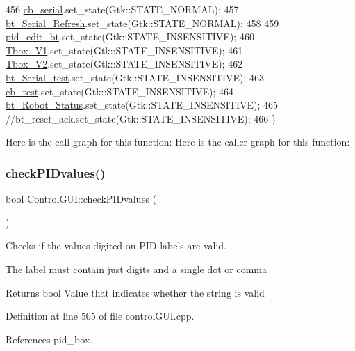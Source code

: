 \begin{DoxyCode}
456     \hyperlink{class_control_g_u_i_a730f792c7de4d8c3cd4c933876d8bc52}{cb\_serial}.set\_state(Gtk::STATE\_NORMAL);
457     \hyperlink{class_control_g_u_i_a391e47311e2e097bf551726b1df5d794}{bt\_Serial\_Refresh}.set\_state(Gtk::STATE\_NORMAL);
458 
459     \hyperlink{class_control_g_u_i_a25b5eb5bf471a963e86624d3fa2c39a7}{pid\_edit\_bt}.set\_state(Gtk::STATE\_INSENSITIVE);
460     \hyperlink{class_control_g_u_i_a8c9b9a41a7ac7de9a7c1c323f70e43b4}{Tbox\_V1}.set\_state(Gtk::STATE\_INSENSITIVE);
461     \hyperlink{class_control_g_u_i_ad4ec00b7d15236b0b8e6723e115c190a}{Tbox\_V2}.set\_state(Gtk::STATE\_INSENSITIVE);
462     \hyperlink{class_control_g_u_i_a877559405ad1764d83748016a0f09d94}{bt\_Serial\_test}.set\_state(Gtk::STATE\_INSENSITIVE);
463     \hyperlink{class_control_g_u_i_a93ab5972cf38d2cf8431cb375abc56e6}{cb\_test}.set\_state(Gtk::STATE\_INSENSITIVE);
464     \hyperlink{class_control_g_u_i_aa41e46c34d55d0d4c7b53ed2fa14deb8}{bt\_Robot\_Status}.set\_state(Gtk::STATE\_INSENSITIVE);
465     \textcolor{comment}{//bt\_reset\_ack.set\_state(Gtk::STATE\_INSENSITIVE);}
466 \}
\end{DoxyCode}
Here is the call graph for this function\+:
Here is the caller graph for this function\+:
\mbox{\label{class_control_g_u_i_a99b0828efc587f0f29d58eeb708f266e}} 
\subsubsection{\texorpdfstring{check\+P\+I\+Dvalues()}{checkPIDvalues()}}
{\footnotesize\ttfamily bool Control\+G\+U\+I\+::check\+P\+I\+Dvalues (\begin{DoxyParamCaption}{ }\end{DoxyParamCaption})}



Checks if the values digited on P\+ID labels are valid. 

The label must contain just digits and a single dot or comma \begin{DoxyReturn}{Returns}
bool Value that indicates whether the string is valid 
\end{DoxyReturn}


Definition at line 505 of file control\+G\+U\+I.\+cpp.



References pid\+\_\+box.


